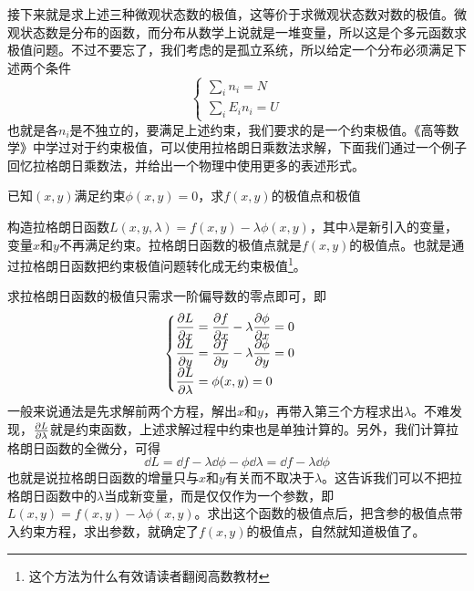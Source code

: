 \documentclass[../../main.tex]{subfiles}
\begin{document}
接下来就是求上述三种微观状态数的极值，这等价于求微观状态数对数的极值。微观状态数是分布的函数，而分布从数学上说就是一堆变量，所以这是个多元函数求极值问题。不过不要忘了，我们考虑的是孤立系统，所以给定一个分布必须满足下述两个条件
\begin{equation}
    \begin{cases}
        \displaystyle \sum_i n_i=N \\
        \displaystyle \sum_i E_in_i=U
    \end{cases}
\end{equation}
也就是各\(n_i\)是不独立的，要满足上述约束，我们要求的是一个约束极值。《高等数学》中学过对于约束极值，可以使用拉格朗日乘数法求解，下面我们通过一个例子回忆拉格朗日乘数法，并给出一个物理中使用更多的表述形式。
\begin{example}
    已知\((x,y)\)满足约束\(\phi(x,y)=0\)，求\(f(x,y)\)的极值点和极值
    \begin{solution}
        构造拉格朗日函数\(L(x,y,\lambda)=f(x,y)-\lambda\phi(x,y)\)，其中\(\lambda\)是新引入的变量，变量\(x\)和\(y\)不再满足约束。拉格朗日函数的极值点就是\(f(x,y)\)的极值点。也就是通过拉格朗日函数把约束极值问题转化成无约束极值\footnote{这个方法为什么有效请读者翻阅高数教材}。

        求拉格朗日函数的极值只需求一阶偏导数的零点即可，即
        \begin{equation*}
            \begin{cases}
                \displaystyle \pdv{L}{x}=\pdv{f}{x}-\lambda\pdv{\phi}{x}=0 \\
                \displaystyle \pdv{L}{y}=\pdv{f}{y}-\lambda\pdv{\phi}{y}=0 \\
                \displaystyle \pdv{L}{\lambda}=\phi(x,y)=0
            \end{cases}
        \end{equation*}
        一般来说通法是先求解前两个方程，解出\(x\)和\(y\)，再带入第三个方程求出\(\lambda\)。不难发现，\(\pdv{L}{\lambda}\)就是约束函数，上述求解过程中约束也是单独计算的。另外，我们计算拉格朗日函数的全微分，可得
        \begin{equation*}
            \dd L=\dd f-\lambda\dd \phi-\phi\dd \lambda=\dd f-\lambda\dd \phi
        \end{equation*}
        也就是说拉格朗日函数的增量只与\(x\)和\(y\)有关而不取决于\(\lambda\)。这告诉我们可以不把拉格朗日函数中的\(\lambda\)当成新变量，而是仅仅作为一个参数，即\(L(x,y)=f(x,y)-\lambda\phi(x,y)\)。求出这个函数的极值点后，把含参的极值点带入约束方程，求出参数，就确定了\(f(x,y)\)的极值点，自然就知道极值了。
    \end{solution}
\end{example}
\end{document}
